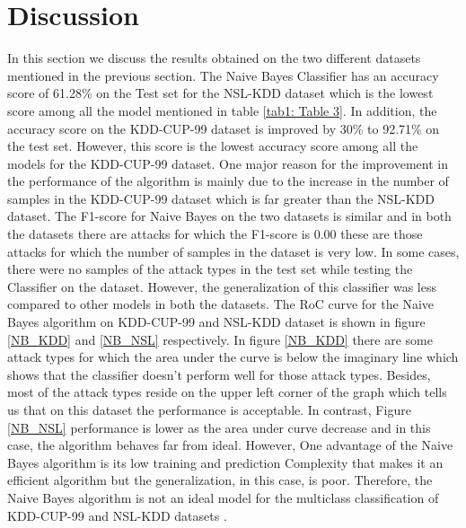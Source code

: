 \documentclass[conference]{IEEEtran}
\begin{document}
\section{Discussion}
In this section we discuss the results obtained on the two different datasets \cite{KDDcup99} mentioned in the previous section. The Naive Bayes Classifier \cite{NB} has an accuracy score of 61.28\% on the Test set for the NSL-KDD dataset \cite{KDDcup99} which is the lowest score among all the model mentioned in table \ref{tab1: Table 3}. In addition, the accuracy score on the KDD-CUP-99 dataset is improved by 30\% to 92.71\% on the test set. However, this score is the lowest accuracy score among all the models for the KDD-CUP-99 dataset. One major reason for the improvement in the performance of the algorithm is mainly due to the increase in the number of samples in the KDD-CUP-99 dataset which is far greater than the NSL-KDD dataset. The F1-score for Naive Bayes on the two datasets is similar and in both the datasets there are attacks for which the F1-score is 0.00 these are those attacks for which the number of samples in the dataset is very low. In some cases, there were no samples of the attack types in the test set while testing the Classifier on the dataset. However, the generalization of this classifier was less compared to other models in both the datasets. The RoC curve for the Naive Bayes algorithm on KDD-CUP-99 and NSL-KDD dataset is shown in figure \ref{NB_KDD} and \ref{NB_NSL} respectively. In figure \ref{NB_KDD} there are some attack types for which the area under the curve is below the imaginary line which shows that the classifier doesn't perform well for those attack types. Besides, most of the attack types reside on the upper left corner of the graph which tells us that on this dataset the performance is acceptable. In contrast, Figure \ref{NB_NSL} performance is lower as the area under curve decrease and in this case, the algorithm behaves far from ideal. However, One advantage of the Naive Bayes algorithm is its low training and prediction Complexity that makes it an efficient algorithm but the generalization, in this case, is poor. Therefore, the Naive Bayes algorithm is not an ideal model for the multiclass classification of KDD-CUP-99 and NSL-KDD datasets \cite{KDDcup99}.
\end{document}
